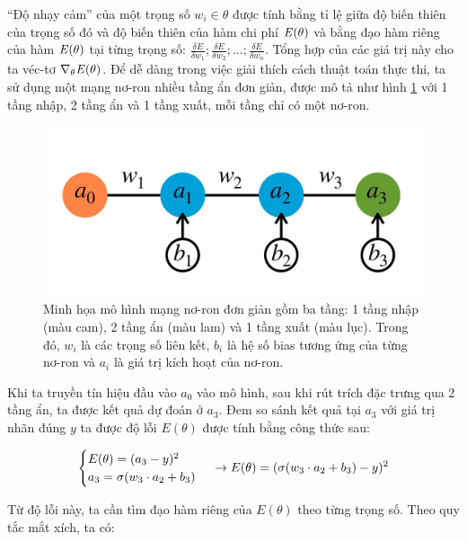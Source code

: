 ``Độ nhạy cảm'' của một trọng số $w_i \in \theta$ được tính bằng tỉ lệ giữa độ biến thiên của trọng số đó và độ biến thiên của hàm chi phí $\mathbf{\it{E}(\theta)}$ và bằng đạo hàm riêng của hàm $\mathbf{\it{E}(\theta)}$ tại từng trọng số: $\frac{\delta E}{\delta w_1}; \frac{\delta E}{\delta w_2};...;\frac{\delta E}{\delta w_n}$. Tổng hợp của các giá trị này cho ta véc-tơ $\nabla_\theta \mathbf{\it{E}(\theta)}$. Để dễ dàng trong việc giải thích cách thuật toán thực thi, ta sử dụng một mạng nơ-ron nhiều tầng ẩn đơn giản, được mô tả như hình \ref{fig:wandb} với 1 tầng nhập, 2 tầng ẩn và 1 tầng xuất, mỗi tầng chỉ có một nơ-ron.

\begin{figure}[htp]
	\centering
	\includegraphics[width=140 mm]{images/wandb.jpg}
	\caption{Minh họa mô hình mạng nơ-ron đơn giản gồm ba tầng: 1 tầng nhập (màu cam), 2 tầng ẩn (màu lam) và 1 tầng xuất (màu lục). Trong đó, $w_i$ là các trọng số liên kết, $b_i$ là hệ số bias tương ứng của từng nơ-ron và $a_i$ là giá trị kích hoạt của nơ-ron.}
	\label{fig:wandb}
\end{figure}

Khi ta truyền tín hiệu đầu vào $a_0$ vào mô hình, sau khi rút trích đặc trưng qua 2 tầng ẩn, ta được kết quả dự đoán ở $a_3$. Đem so sánh kết quả tại $a_3$ với giá trị nhãn đúng $y$ ta được độ lỗi $E(\theta)$ được tính bằng công thức sau:

\begin{equation}
	\begin{cases}
		E(\theta) = (a_3 - y)^2 \\
		a_3 = \sigma(w_3\cdot a_2 + b_3)
	\end{cases} \\
	\rightarrow E(\theta) = (\sigma(w_3\cdot a_2 + b_3) - y)^2
\end{equation}

Từ độ lỗi này, ta cần tìm đạo hàm riêng của $E(\theta)$ theo từng trọng số. Theo quy tắc mắt xích, ta có:

